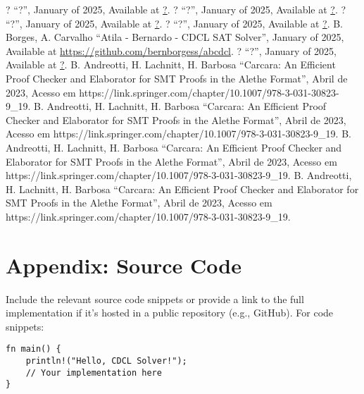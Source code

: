 \documentclass[a4paper,12pt]{article}
\begin{document}
\begin{thebibliography}{00}
             ? ``?'', January of 2025, Available at \url{?}.
                  ? ``?'', January of 2025, Available at \url{?}.
                   ? ``?'', January of 2025, Available at \url{?}.
             ? ``?'', January of 2025, Available at \url{?}.
              B. Borges, A. Carvalho ``Atila - Bernardo - CDCL SAT Solver'', January of 2025, Available at \url{https://github.com/bernborgess/abcdcl}.
                   ? ``?'', January of 2025, Available at \url{?}.
      B. Andreotti, H. Lachnitt, H. Barbosa ``Carcara: An Efficient Proof Checker and Elaborator for SMT Proofs in the Alethe Format'', Abril de 2023, Acesso em https://link.springer.com/chapter/10.1007/978-3-031-30823-9\_19.
                      B. Andreotti, H. Lachnitt, H. Barbosa ``Carcara: An Efficient Proof Checker and Elaborator for SMT Proofs in the Alethe Format'', Abril de 2023, Acesso em https://link.springer.com/chapter/10.1007/978-3-031-30823-9\_19.
               B. Andreotti, H. Lachnitt, H. Barbosa ``Carcara: An Efficient Proof Checker and Elaborator for SMT Proofs in the Alethe Format'', Abril de 2023, Acesso em https://link.springer.com/chapter/10.1007/978-3-031-30823-9\_19.
              B. Andreotti, H. Lachnitt, H. Barbosa ``Carcara: An Efficient Proof Checker and Elaborator for SMT Proofs in the Alethe Format'', Abril de 2023, Acesso em https://link.springer.com/chapter/10.1007/978-3-031-30823-9\_19.
\end{thebibliography}

\newpage
\appendix
\section{Appendix: Source Code}
\label{sec:appendix}
Include the relevant source code snippets or provide a link to the full implementation if it's hosted in a public repository (e.g., GitHub). For code snippets:
\begin{verbatim}
fn main() {
    println!("Hello, CDCL Solver!");
    // Your implementation here
}
\end{verbatim}
\end{document}
